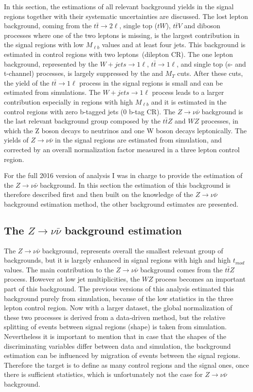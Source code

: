 In this section, the estimations of all relevant background yields in the signal regions together with their systematic uncertainties are discussed. The lost lepton background, coming from the $t\bar{t} \to 2 \ell$, single top ($tW$), $t\bar{t}V$ and diboson processes where one of the two leptons is missing, is the largest contribution in the signal regions with low $M_{\ell b}$ values and at least four jets. This background is estimated in control regions with two leptons~(dilepton CR). The one lepton background, represented by the $W+jets \to 1\ell$, $t\bar{t} \to 1\ell$, and single top (s- and t-channel) processes, is largely suppressed by the \MET and $M_{T}$ cuts. After these cuts, the yield of the $t\bar{t} \to 1\ell$ process in the signal regions is small and can be estimated from simulations. The $W+jets \to 1\ell$  process leads to a larger contribution especially in regions with high $M_{\ell b}$ and it is estimated in the control regions with zero b-tagged jets (0 b-tag CR). The $Z \to \nu \bar{\nu}$ background is the last relevant background group composed by the $t\bar{t}Z$ and $WZ$ processes, in which the Z boson decays to neutrinos and one W boson decays leptonically. The yields of $Z \to \nu \bar{\nu}$ in the signal regions are estimated from simulation, and corrected by an overall normalization factor measured in a three lepton control region.  

For the full 2016 version of analysis I was in charge to provide the estimation of the $Z \to \nu \bar{\nu}$ background. In this section the estimation of this background is therefore described first and then built on the knowledge of the $Z \to \nu \bar{\nu}$ background estimation method, the other background estimates are presented.


\subsection{The $Z \to \nu \bar{\nu}$ background estimation}

The $Z \to \nu \bar{\nu}$ background,  represents overall the smallest relevant group of backgrounds, but it is largely enhanced in signal regions with high \MET and high $t_{mod}$ values. The main contribution to the $Z \to \nu \bar{\nu}$ background comes from the $t\bar{t}Z$ process. However at low jet multiplicities, the $WZ$ process becomes an important part of this background.  The previous versions of this analysis estimated this background purely from simulation, because of the low statistics in the three lepton control region. Now with a larger dataset, the global normalization of these two processes is derived from a data-driven method, but the relative splitting of events between signal regions (shape) is taken from simulation. Nevertheless it is important to mention that in case that the shapes of the discriminating variables differ between data and simulation, the background estimation can be influenced by migration of events between the signal regions. Therefore the target is to define as many control regions and the signal ones, once there is sufficient statistics, which is unfortunately not the case for $Z \to \nu \bar{\nu}$ background. 

